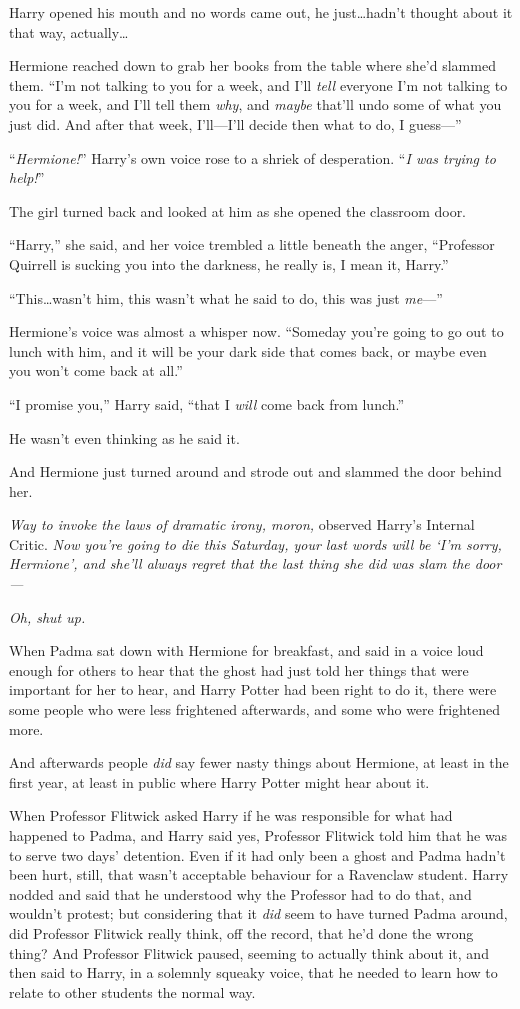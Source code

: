 Harry opened his mouth and no words came out, he just…hadn’t thought about it that way, actually…

Hermione reached down to grab her books from the table where she’d slammed them. “I’m not talking to you for a week, and I’ll \emph{tell} everyone I’m not talking to you for a week, and I’ll tell them \emph{why}, and \emph{maybe} that’ll undo some of what you just did. And after that week, I’ll—I’ll decide then what to do, I guess—”

“\emph{Hermione!}” Harry’s own voice rose to a shriek of desperation. “\emph{I was trying to help!}”

The girl turned back and looked at him as she opened the classroom door.

“Harry,” she said, and her voice trembled a little beneath the anger, “Professor Quirrell is sucking you into the darkness, he really is, I mean it, Harry.”

“This…wasn’t him, this wasn’t what he said to do, this was just \emph{me}—”

Hermione’s voice was almost a whisper now. “Someday you’re going to go out to lunch with him, and it will be your dark side that comes back, or maybe even you won’t come back at all.”

“I promise you,” Harry said, “that I \emph{will} come back from lunch.”

He wasn’t even thinking as he said it.

And Hermione just turned around and strode out and slammed the door behind her.

\emph{Way to invoke the laws of dramatic irony, moron,} observed Harry’s Internal Critic. \emph{Now you’re going to die this Saturday, your last words will be ‘I’m sorry, Hermione’, and she’ll always regret that the last thing she did was slam the door—}

\emph{Oh, shut up.}

\later

When Padma sat down with Hermione for breakfast, and said in a voice loud enough for others to hear that the ghost had just told her things that were important for her to hear, and Harry Potter had been right to do it, there were some people who were less frightened afterwards, and some who were frightened more.

And afterwards people \emph{did} say fewer nasty things about Hermione, at least in the first year, at least in public where Harry Potter might hear about it.

When Professor Flitwick asked Harry if he was responsible for what had happened to Padma, and Harry said yes, Professor Flitwick told him that he was to serve two days’ detention. Even if it had only been a ghost and Padma hadn’t been hurt, still, that wasn’t acceptable behaviour for a Ravenclaw student. Harry nodded and said that he understood why the Professor had to do that, and wouldn’t protest; but considering that it \emph{did} seem to have turned Padma around, did Professor Flitwick really think, off the record, that he’d done the wrong thing? And Professor Flitwick paused, seeming to actually think about it, and then said to Harry, in a solemnly squeaky voice, that he needed to learn how to relate to other students the normal way.

